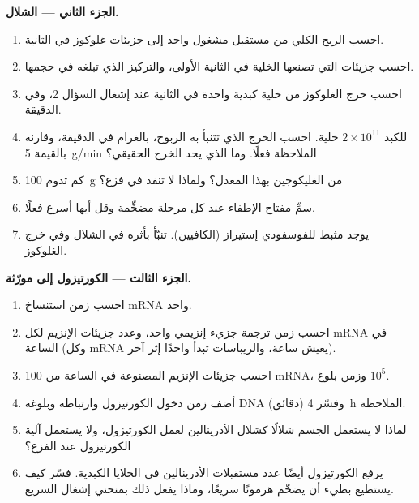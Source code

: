 \begin{problem}
\medskip
\noindent\textbf{الجزء الثاني --- الشلال.}
\begin{enumerate}[resume]
  \item احسب الربح الكلي من مستقبل مشغول واحد إلى
        جزيئات غلوكوز في الثانية.
  \item احسب جزيئات  التي تصنعها الخلية في الثانية
        الأولى، والتركيز الذي تبلغه في حجمها.
  \item احسب خرج الغلوكوز من خلية كبدية واحدة في الثانية عند
        إشغال السؤال 2، وفي الدقيقة.
  \item للكبد $2\times 10^{11}$ خلية. احسب الخرج
        الذي تتنبأ به الربوح، بالغرام في الدقيقة، وقارنه بالقيمة
        \qty{5}{g/min} الملاحظة فعلًا. وما الذي يحد الخرج
        الحقيقي؟
  \item كم تدوم \qty{100}{g} من الغليكوجين بهذا
        المعدل؟ ولماذا لا تنفد في فزع؟
  \item سمِّ مفتاح الإطفاء عند كل مرحلة مضخِّمة وقل أيها
        أسرع فعلًا.
  \item يوجد مثبط للفوسفودي إستيراز (الكافيين). تنبّأ
        بأثره في الشلال وفي خرج الغلوكوز.
\end{enumerate}

\medskip
\noindent\textbf{الجزء الثالث --- الكورتيزول إلى مورّثة.}
\begin{enumerate}[resume]
  \item احسب زمن استنساخ mRNA واحد.
  \item احسب زمن ترجمة جزيء إنزيمي واحد، وعدد
        جزيئات الإنزيم لكل mRNA في الساعة (وكل mRNA
        يعيش ساعة، والريباسات تبدأ واحدًا إثر آخر).
  \item احسب جزيئات الإنزيم المصنوعة في الساعة من
        \num{100} mRNA، وزمن بلوغ $10^{5}$.
  \item أضف زمن دخول الكورتيزول وارتباطه وبلوغه DNA
        (دقائق) وفسّر \qty{4}{h} الملاحظة.
  \item لماذا لا يستعمل الجسم شلالًا كشلال الأدرينالين
        لعمل الكورتيزول، ولا يستعمل آلية الكورتيزول عند
        الفزع؟
  \item يرفع الكورتيزول أيضًا عدد مستقبلات الأدرينالين في
        الخلايا الكبدية. فسّر كيف يستطيع  بطيء أن يضخّم
        هرمونًا سريعًا، وماذا يفعل ذلك بمنحني إشغال السريع.
\end{enumerate}


\end{problem}
